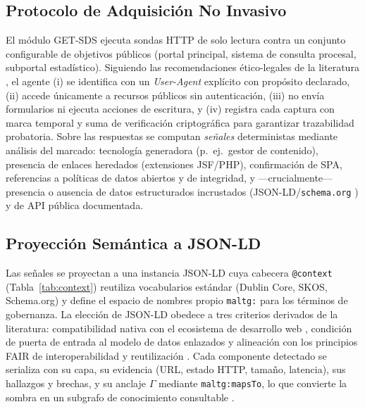 \documentclass[computers,article,submit,pdftex,moreauthors]{Definitions/mdpi}
\begin{document}
\subsection{Protocolo de Adquisición No Invasivo}
El módulo GET-SDS ejecuta sondas HTTP de solo lectura contra un conjunto configurable de objetivos públicos (portal principal, sistema de consulta procesal, subportal estadístico). Siguiendo las recomendaciones ético-legales de la literatura \cite{Krotov2020}, el agente (i) se identifica con un \emph{User-Agent} explícito con propósito declarado, (ii) accede únicamente a recursos públicos sin autenticación, (iii) no envía formularios ni ejecuta acciones de escritura, y (iv) registra cada captura con marca temporal y suma de verificación criptográfica para garantizar trazabilidad probatoria. Sobre las respuestas se computan \emph{señales} deterministas mediante análisis del marcado: tecnología generadora (p.~ej.\ gestor de contenido), presencia de enlaces heredados (extensiones JSF/PHP), confirmación de SPA, referencias a políticas de datos abiertos y de integridad, y —crucialmente— presencia o ausencia de datos estructurados incrustados (JSON-LD/\texttt{schema.org} \cite{Guha2016}) y de API pública documentada.

\subsection{Proyección Semántica a JSON-LD}
Las señales se proyectan a una instancia JSON-LD cuya cabecera \texttt{@context} (Tabla~\ref{tab:context}) reutiliza vocabularios estándar (Dublin Core, SKOS, Schema.org) y define el espacio de nombres propio \texttt{maltg:} para los términos de gobernanza. La elección de JSON-LD obedece a tres criterios derivados de la literatura: compatibilidad nativa con el ecosistema de desarrollo web \cite{Guha2016}, condición de puerta de entrada al modelo de datos enlazados \cite{Bizer2009,Hitzler2021} y alineación con los principios FAIR de interoperabilidad y reutilización \cite{Wilkinson2016}. Cada componente detectado se serializa con su capa, su evidencia (URL, estado HTTP, tamaño, latencia), sus hallazgos y brechas, y su anclaje $\Gamma$ mediante \texttt{maltg:mapsTo}, lo que convierte la sombra en un subgrafo de conocimiento consultable \cite{Hogan2021}.
\end{document}
